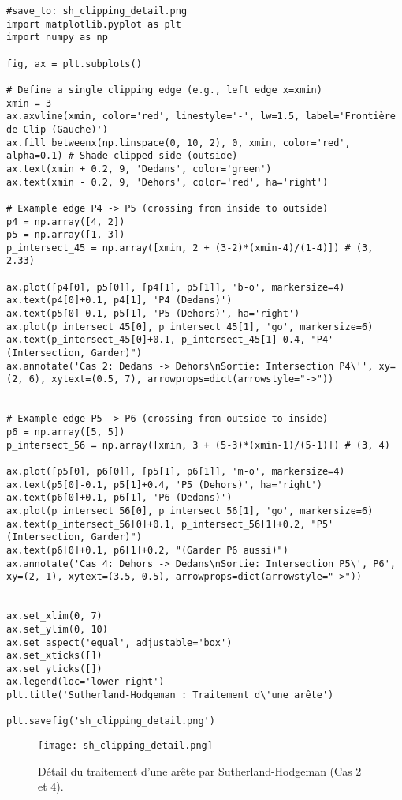 \documentclass{article}
\begin{document}
{\begin{verbatim}
#save_to: sh_clipping_detail.png
import matplotlib.pyplot as plt
import numpy as np

fig, ax = plt.subplots()

# Define a single clipping edge (e.g., left edge x=xmin)
xmin = 3
ax.axvline(xmin, color='red', linestyle='-', lw=1.5, label='Frontière de Clip (Gauche)')
ax.fill_betweenx(np.linspace(0, 10, 2), 0, xmin, color='red', alpha=0.1) # Shade clipped side (outside)
ax.text(xmin + 0.2, 9, 'Dedans', color='green')
ax.text(xmin - 0.2, 9, 'Dehors', color='red', ha='right')

# Example edge P4 -> P5 (crossing from inside to outside)
p4 = np.array([4, 2])
p5 = np.array([1, 3])
p_intersect_45 = np.array([xmin, 2 + (3-2)*(xmin-4)/(1-4)]) # (3, 2.33)

ax.plot([p4[0], p5[0]], [p4[1], p5[1]], 'b-o', markersize=4)
ax.text(p4[0]+0.1, p4[1], 'P4 (Dedans)')
ax.text(p5[0]-0.1, p5[1], 'P5 (Dehors)', ha='right')
ax.plot(p_intersect_45[0], p_intersect_45[1], 'go', markersize=6)
ax.text(p_intersect_45[0]+0.1, p_intersect_45[1]-0.4, "P4' (Intersection, Garder)")
ax.annotate('Cas 2: Dedans -> Dehors\nSortie: Intersection P4\'', xy=(2, 6), xytext=(0.5, 7), arrowprops=dict(arrowstyle="->"))


# Example edge P5 -> P6 (crossing from outside to inside)
p6 = np.array([5, 5])
p_intersect_56 = np.array([xmin, 3 + (5-3)*(xmin-1)/(5-1)]) # (3, 4)

ax.plot([p5[0], p6[0]], [p5[1], p6[1]], 'm-o', markersize=4)
ax.text(p5[0]-0.1, p5[1]+0.4, 'P5 (Dehors)', ha='right')
ax.text(p6[0]+0.1, p6[1], 'P6 (Dedans)')
ax.plot(p_intersect_56[0], p_intersect_56[1], 'go', markersize=6)
ax.text(p_intersect_56[0]+0.1, p_intersect_56[1]+0.2, "P5' (Intersection, Garder)")
ax.text(p6[0]+0.1, p6[1]+0.2, "(Garder P6 aussi)")
ax.annotate('Cas 4: Dehors -> Dedans\nSortie: Intersection P5\', P6', xy=(2, 1), xytext=(3.5, 0.5), arrowprops=dict(arrowstyle="->"))


ax.set_xlim(0, 7)
ax.set_ylim(0, 10)
ax.set_aspect('equal', adjustable='box')
ax.set_xticks([])
ax.set_yticks([])
ax.legend(loc='lower right')
plt.title('Sutherland-Hodgeman : Traitement d\'une arête')

plt.savefig('sh_clipping_detail.png')
\end{verbatim}

\begin{figure}[H]
\centering
\texttt{[image: sh\_clipping\_detail.png]}
\caption{Détail du traitement d'une arête par Sutherland-Hodgeman (Cas 2 et 4).}
\label{fig:sh_clipping_detail}
\end{figure}

}
\end{document}
